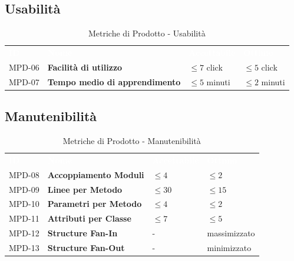 \documentclass[a4paper, 11pt]{article}
\begin{document}
\subsection{Usabilità}
\begin{table}[h!]
    \centering
    \begin{tabular}{>{\centering\arraybackslash}m{1.5cm} p{6cm} >{\centering\arraybackslash}m{3cm} >{\centering\arraybackslash}m{2.5cm}}
        \rowcolor{AccentColor}
        \textcolor{white}{\textbf{ID}} & \textcolor{white}{\textbf{Nome}} & \textcolor{white}{\textbf{Accettabile}} & \textcolor{white}{\textbf{Ottimo}} \\
        MPD-06 & \textbf{Facilità di utilizzo} & $\leq 7$ click & $\leq 5$ click\\
        MPD-07 & \textbf{Tempo medio di apprendimento} & $\leq 5$ minuti & $\leq 2$ minuti\\
    \end{tabular}
    \caption{Metriche di Prodotto - Usabilità}
\end{table}

\subsection{Manutenibilità}
\begin{table}[h!]
    \centering
    \begin{tabular}{>{\centering\arraybackslash}m{1.5cm} p{6cm} >{\centering\arraybackslash}m{3cm} >{\centering\arraybackslash}m{2.5cm}}
        \rowcolor{AccentColor}
        \textcolor{white}{\textbf{ID}} & \textcolor{white}{\textbf{Nome}} & \textcolor{white}{\textbf{Accettabile}} & \textcolor{white}{\textbf{Ottimo}} \\
        MPD-08 & \textbf{Accoppiamento Moduli} & $\leq 4$ & $\leq 2$ \\
        MPD-09 & \textbf{Linee per Metodo} & $\leq 30$ & $\leq 15$ \\
        MPD-10 & \textbf{Parametri per Metodo} & $\leq 4$ & $\leq 2$ \\
        MPD-11 & \textbf{Attributi per Classe} & $\leq 7$ & $\leq 5$ \\
        MPD-12 & \textbf{Structure Fan-In} & - & massimizzato \\
        MPD-13 & \textbf{Structure Fan-Out} & - & minimizzato \\
    \end{tabular}
    \caption{Metriche di Prodotto - Manutenibilità}
\end{table}
\end{document}
